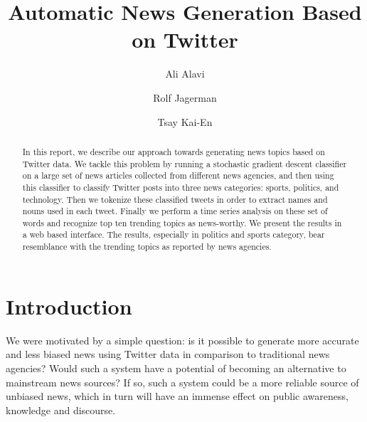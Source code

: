 \documentclass{llncs}
\begin{document}
%
\mainmatter              %
\pagestyle{headings}

%
\title{Automatic News Generation Based on Twitter}
%
%
\author{Ali Alavi \and Rolf Jagerman \and
Tsay Kai-En}
%
%
%

\maketitle              %
%

\begin{abstract}
In this report, we describe our approach towards generating news topics based on Twitter data. We tackle this problem by running a stochastic gradient descent classifier on a large set of news articles collected from different news agencies, and then using this classifier to classify Twitter posts into three news categories: sports, politics, and technology. Then we tokenize these classified tweets in order to extract names and nouns used in each tweet. Finally we perform a time series analysis on these set of words and recognize top ten trending topics as news-worthy. We present the results in a web based interface. The results, especially in politics and sports category, bear resemblance with the trending topics as reported by news agencies.
\end{abstract}

\section{Introduction}

We were motivated by a simple question: is it possible to generate more accurate and less biased news using Twitter data in comparison to traditional news agencies? Would such a system have a potential of becoming an alternative to mainstream news sources? If so, such a system could be a more reliable source of unbiased news, which in turn will have an immense effect on public awareness, knowledge and discourse.
\end{document}
